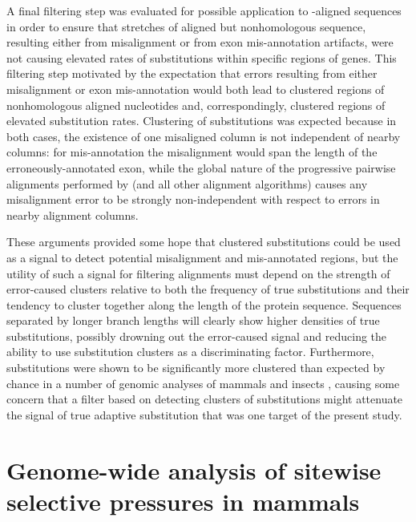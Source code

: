 A final filtering step was evaluated for possible application to
\prank{}-aligned sequences in order to ensure that stretches of
aligned but nonhomologous sequence, resulting either from misalignment
or from exon mis-annotation artifacts, were not causing elevated rates
of \nsyn substitutions within specific regions of genes. This
filtering step motivated by the expectation that errors resulting from
either misalignment or exon mis-annotation would both lead to
clustered regions of nonhomologous aligned nucleotides and,
correspondingly, clustered regions of elevated \nsyn substitution
rates. Clustering of \nsyn substitutions was expected because in both
cases, the existence of one misaligned column is not independent of
nearby columns: for mis-annotation the misalignment would span the
length of the erroneously-annotated exon, while the global nature of
the progressive pairwise alignments performed by \prank{} (and all
other alignment algorithms) causes any misalignment error to be
strongly non-independent with respect to errors in nearby alignment
columns.

These arguments provided some hope that clustered \nsyn substitutions
could be used as a signal to detect potential misalignment and
mis-annotated regions, but the utility of such a signal for filtering
alignments must depend on the strength of error-caused \nsyn clusters
relative to both the frequency of true \nsyn substitutions and their
tendency to cluster together along the length of the protein
sequence. Sequences separated by longer branch lengths will clearly
show higher densities of true \nsyn substitutions, possibly drowning
out the error-caused signal and reducing the ability to use
substitution clusters as a discriminating factor. Furthermore, \nsyn
substitutions were shown to be significantly more clustered than
expected by chance in a number of genomic analyses of mammals and
insects \citep{TODO, Callahan et al. PLoS Gen 2011, Bazykin et
  al. Nature 2004, Wang et al. PNAS 2007}, causing some concern that a
filter based on detecting clusters of \nsyn substitutions might
attenuate the signal of true adaptive substitution that was one target
of the present study.


\section{Genome-wide analysis of sitewise selective pressures in mammals}

